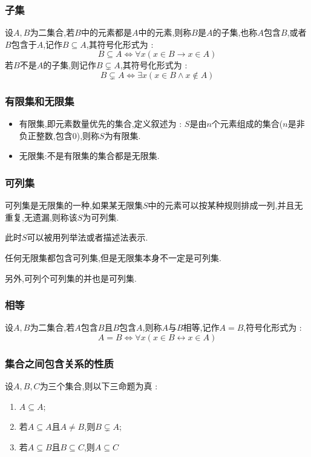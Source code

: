 {{\subsubsection{子集}{
  设$A,B$为二集合,若$B$中的元素都是$A$中的元素,则称$B$是$A$的子集,也称$A$包含$B$,或者$B$包含于$A$,记作$B \subseteq A$,其符号化形式为 : $$
    B \subseteq A \Leftrightarrow \forall x (x \in B \to x \in A)
  $$
  若$B$不是$A$的子集,则记作$B \subsetneq A$,其符号化形式为 : $$
    B \subsetneq A \Leftrightarrow \exists x (x \in B \land x \notin A)
  $$
}%

\subsubsection{有限集和无限集}{
  \begin{itemize}
    \item 有限集,即元素数量优先的集合,定义叙述为 : $S$是由$n$个元素组成的集合($n$是非负正整数,包含0),则称$S$为有限集.
    \item 无限集:不是有限集的集合都是无限集.
  \end{itemize}
}%

\subsubsection{可列集}{
  可列集是无限集的一种,如果某无限集$S$中的元素可以按某种规则排成一列,并且无重复,无遗漏,则称该$S$为可列集.

  此时$S$可以被用列举法或者描述法表示.

  任何无限集都包含可列集,但是无限集本身不一定是可列集.

  另外,可列个可列集的并也是可列集.

}%

\subsubsection{相等}{
  设$A,B$为二集合,若$A$包含$B$且$B$包含$A$,则称$A$与$B$相等,记作$A = B$,符号化形式为 : $$
    A = B \Leftrightarrow \forall x (x \in B \leftrightarrow x \in A)
  $$
}%

\subsubsection{集合之间包含关系的性质}{
  设$A,B,C$为三个集合,则以下三命题为真 :

  \begin{enumerate}
    \item $A \subseteq A$;
    \item 若$A \subseteq A$且$A \neq B$,则$B \subsetneq A$;
    \item 若$A \subseteq B$且$B \subseteq C$,则$A \subseteq C$
  \end{enumerate}
}%

}}

